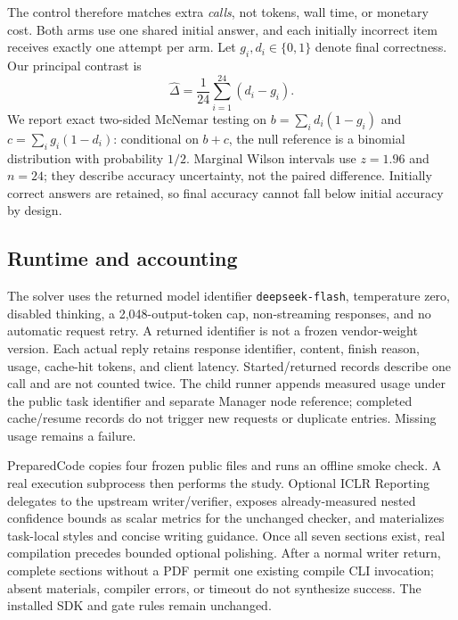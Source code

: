 The control therefore matches extra \emph{calls}, not tokens, wall time, or monetary cost. Both arms use one shared initial answer, and each initially incorrect item receives exactly one attempt per arm. Let $g_i,d_i\in\{0,1\}$ denote final correctness. Our principal contrast is
\begin{equation}
\widehat{\Delta}=\frac{1}{24}\sum_{i=1}^{24}(d_i-g_i).
\end{equation}
We report exact two-sided McNemar testing on $b=\sum_i d_i(1-g_i)$ and $c=\sum_i g_i(1-d_i)$: conditional on $b+c$, the null reference is a binomial distribution with probability $1/2$. Marginal Wilson intervals use $z=1.96$ and $n=24$; they describe accuracy uncertainty, not the paired difference. Initially correct answers are retained, so final accuracy cannot fall below initial accuracy by design.

\subsection{Runtime and accounting}
The solver uses the returned model identifier \texttt{deepseek-flash}, temperature zero, disabled thinking, a 2,048-output-token cap, non-streaming responses, and no automatic request retry. A returned identifier is not a frozen vendor-weight version. Each actual reply retains response identifier, content, finish reason, usage, cache-hit tokens, and client latency. Started/returned records describe one call and are not counted twice. The child runner appends measured usage under the public task identifier and separate Manager node reference; completed cache/resume records do not trigger new requests or duplicate entries. Missing usage remains a failure.

PreparedCode copies four frozen public files and runs an offline smoke check. A real execution subprocess then performs the study. Optional ICLR Reporting delegates to the upstream writer/verifier, exposes already-measured nested confidence bounds as scalar metrics for the unchanged checker, and materializes task-local styles and concise writing guidance. Once all seven sections exist, real compilation precedes bounded optional polishing. After a normal writer return, complete sections without a PDF permit one existing compile CLI invocation; absent materials, compiler errors, or timeout do not synthesize success. The installed SDK and gate rules remain unchanged.
